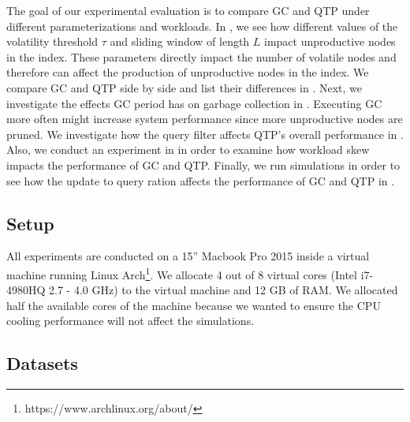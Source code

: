 \documentclass[abstracton,12pt]{scrartcl}
\theoremstyle{definition}
\begin{document}
The goal of our experimental evaluation is to compare GC and QTP under
different parameterizations and workloads.
In , we see how different values of the
volatility threshold $\tau$
and sliding window of length $L$ impact unproductive nodes in the index. These
parameters directly impact the number of volatile nodes and therefore can affect
the production of unproductive nodes in the index. We compare GC and QTP side by
side and list their differences in . Next, we
investigate the effects GC period has on garbage collection in .
Executing GC more often might increase system
performance since more unproductive nodes are pruned. We investigate how
the query filter affects QTP's overall performance in 
. Also, we conduct an
experiment in  in order to examine how
workload skew impacts the performance of GC and QTP. Finally, we run simulations
in order to see how the update to query ration affects the performance of GC and
QTP in .

\subsection{Setup}

All experiments are conducted on a 15'' Macbook Pro 2015 inside
a virtual machine running Linux Arch\footnote{https://www.archlinux.org/about/}.
We allocate 4 out of 8 virtual cores (Intel i7-4980HQ 2.7 - 4.0 GHz) to the virtual
machine and 12 GB of RAM. We allocated half the available cores of the machine
because we wanted to ensure the CPU cooling performance will not affect the simulations.

\subsection{Datasets}

\label{sec:datasets}
\end{document}
